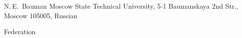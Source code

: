 \vspace*{-15pt}





\noindent


N.\,E.~Bauman Moscow State Technical University, 5-1 Baumanskaya  2nd Str., Moscow 105005, Russian 


Federation








\def\leftfootline{\small{\textbf{\thepage}


\hfill Sistemy i Sredstva Informatiki~---


Systems and Means of Informatics 2023 vol~33 no\,1}


}%


 \def\rightfootline{\small{Sistemy i Sredstva Informatiki~---


 Systems and Means of Informatics 2023 vol~33 no\,1


\hfill \textbf{\thepage}}}





\vspace*{3pt}

























